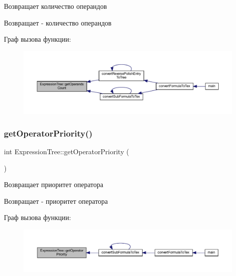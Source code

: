 Возвращает количество операндов 

\begin{DoxyReturn}{Возвращает}
-\/ количество операндов 
\end{DoxyReturn}
Граф вызова функции\+:\nopagebreak
\begin{figure}[H]
\begin{center}
\leavevmode
\includegraphics[width=350pt]{class_expression_tree_a8b072f45d0e8dbcd9aa7159c10792407_icgraph}
\end{center}
\end{figure}
\mbox{\label{class_expression_tree_a1456f080f1d7f83cced830dc98f22d20}} 
\subsubsection{\texorpdfstring{get\+Operator\+Priority()}{getOperatorPriority()}}
{\footnotesize\ttfamily int Expression\+Tree\+::get\+Operator\+Priority (\begin{DoxyParamCaption}{ }\end{DoxyParamCaption})}



Возвращает приоритет оператора 

\begin{DoxyReturn}{Возвращает}
-\/ приоритет оператора 
\end{DoxyReturn}
Граф вызова функции\+:\nopagebreak
\begin{figure}[H]
\begin{center}
\leavevmode
\includegraphics[width=350pt]{class_expression_tree_a1456f080f1d7f83cced830dc98f22d20_icgraph}
\end{center}
\end{figure}
\mbox{\label{class_expression_tree_a2ba380c9b6d05a259f7827269cce4aea}} 

